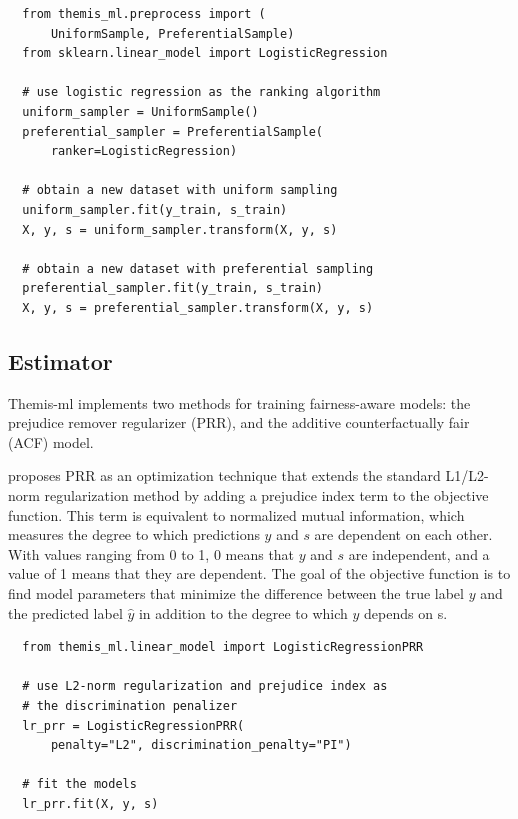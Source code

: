 \documentclass{acm_proc_article-sp}
\begin{document}
\begin{verbatim}
  from themis_ml.preprocess import (
      UniformSample, PreferentialSample)
  from sklearn.linear_model import LogisticRegression

  # use logistic regression as the ranking algorithm
  uniform_sampler = UniformSample()
  preferential_sampler = PreferentialSample(
      ranker=LogisticRegression)

  # obtain a new dataset with uniform sampling
  uniform_sampler.fit(y_train, s_train)
  X, y, s = uniform_sampler.transform(X, y, s)

  # obtain a new dataset with preferential sampling
  preferential_sampler.fit(y_train, s_train)
  X, y, s = preferential_sampler.transform(X, y, s)
\end{verbatim}

\subsection{Estimator}

Themis-ml implements two methods for training fairness-aware models: the
prejudice remover regularizer (PRR), and the additive counterfactually fair
(ACF) model.

\cite{kamishima2012fairness} proposes PRR as an optimization technique that
extends the standard L1/L2-norm regularization method \cite{ng2004feature,
ribeiro2016should} by adding a prejudice index term to the objective function.
This term is equivalent to normalized mutual information, which measures the
degree to which predictions \(y\) and \(s\) are dependent on each other. With
values ranging from 0 to 1, 0 means that \(y\) and \(s\) are independent, and a
value of 1 means that they are dependent. The goal of the objective function is
to find model parameters that minimize the difference between the true label
\(y\) and the predicted label \(\hat{y}\) in addition to the degree to which
\(y\) depends on s.

\begin{verbatim}
  from themis_ml.linear_model import LogisticRegressionPRR

  # use L2-norm regularization and prejudice index as
  # the discrimination penalizer
  lr_prr = LogisticRegressionPRR(
      penalty="L2", discrimination_penalty="PI")

  # fit the models
  lr_prr.fit(X, y, s)
\end{verbatim}
\end{document}
